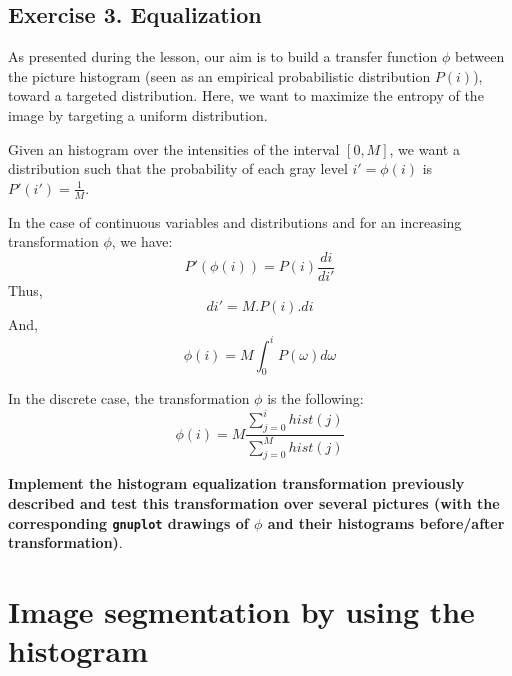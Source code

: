 \documentclass[a4paper, 11pt]{article}
\begin{document}
\subsection*{\bf Exercise 3. \rm Equalization}

\par As presented during the lesson, our aim is to build a transfer function $\phi$ between the picture histogram (seen as an empirical probabilistic distribution $P(i)$), toward a targeted distribution. Here, we want to maximize the entropy of the image by targeting a uniform distribution.

\par Given an histogram over the intensities of the interval $[0,M]$, we want a distribution such that the probability of each gray level $i'=\phi(i)$ is $P'(i')=\frac{1}{M}$.

\par In the case of continuous variables and distributions and for an increasing transformation $\phi$, we have:
\begin{equation}
  P'(\phi(i)) = P(i)\frac{di}{di'}
\end{equation}
Thus,
\begin{equation}
  di' = M.P(i).di
\end{equation}
And,
\begin{equation}
  \phi(i) =  M \int_0^i P(\omega)d\omega
\end{equation}

\par In the discrete case, the transformation $\phi$ is the following:
\begin{equation}
  \phi(i) = M\frac{\sum_{j=0}^{i} hist(j)}{\sum_{j=0}^M hist(j)}
\end{equation}

{\bf Implement the histogram equalization transformation previously described and test this transformation over several pictures (with the corresponding \texttt{gnuplot} drawings of $\phi$ and their histograms before/after transformation)}.


\newpage
\section*{\bf Image segmentation by using the histogram}
\end{document}
